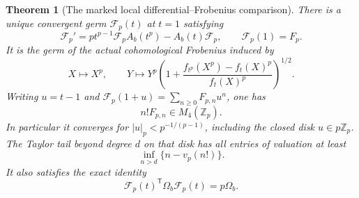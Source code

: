 \documentclass[11pt]{article}
\newtheorem{theorem}{Theorem}[section]
\theoremstyle{definition}
\theoremstyle{remark}
\newcommand{\Z}{\mathbb Z}
\begin{document}
\begin{theorem}[The marked local differential--Frobenius comparison]
\label{thm:v11-horizontal}
There is a unique convergent germ $\mathcal F_p(t)$ at $t=1$ satisfying
\begin{equation}
 \boxed{
 \mathcal F_p'=p t^{p-1}\mathcal F_p A_b(t^p)
                 -A_b(t)\mathcal F_p,
 \qquad \mathcal F_p(1)=F_p.}
 \label{eq:v11-horizontal}
\end{equation}
It is the germ of the actual cohomological Frobenius induced by
\[
 X\mapsto X^p,\qquad
 Y\mapsto Y^p\left(1+
 \frac{f_{t^p}(X^p)-f_t(X)^p}{f_t(X)^p}\right)^{1/2}.
\]
Writing $u=t-1$ and $\mathcal F_p(1+u)=\sum_{n\ge0}F_{p,n}u^n$,
one has
\begin{equation}
 \boxed{n! F_{p,n}\in M_4(\Z_p).}
 \label{eq:v11-factorial}
\end{equation}
In particular it converges for $|u|_p<p^{-1/(p-1)}$, including the
closed disk $u\in p\Z_p$. The Taylor tail beyond degree $d$ on that
disk has all entries of valuation at least
\begin{equation}
 \inf_{n>d}\{n-v_p(n!)\}.
 \label{eq:v11-u-tail}
\end{equation}
It also satisfies the exact identity
\begin{equation}
 \boxed{\mathcal F_p(t)^{\mathsf T}\Omega_b\mathcal F_p(t)
       =p\Omega_b.}
 \label{eq:v11-germ-similitude}
\end{equation}
\end{theorem}
\end{document}
